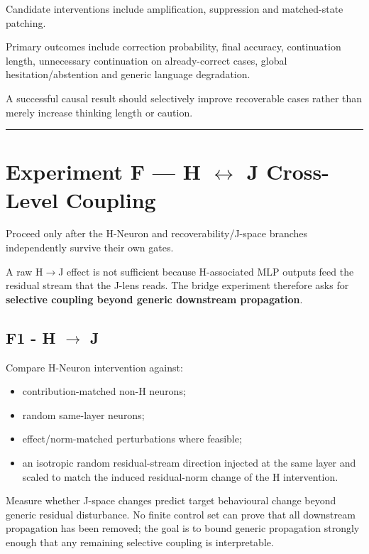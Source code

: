 Candidate interventions include amplification, suppression and matched-state patching.

Primary outcomes include correction probability, final accuracy, continuation length, unnecessary continuation on already-correct cases, global hesitation/abstention and generic language degradation.

A successful causal result should selectively improve recoverable cases rather than merely increase thinking length or caution.

\begin{center}\rule{0.5\linewidth}{0.5pt}\end{center}

\section{Experiment F --- H \texorpdfstring{$\leftrightarrow$}{<->} J Cross-Level Coupling}\label{experiment-f-h---j-cross-level-coupling}

Proceed only after the H-Neuron and recoverability/J-space branches independently survive their own gates.

A raw H\(\rightarrow\)J effect is not sufficient because H-associated MLP outputs feed the residual stream that the J-lens reads. The bridge experiment therefore asks for \textbf{selective coupling beyond generic downstream propagation}.

\subsection{F1 - H \texorpdfstring{$\rightarrow$}{->} J}\label{f1---h---j}

Compare H-Neuron intervention against:

\begin{itemize}
\tightlist
\item contribution-matched non-H neurons;
\item random same-layer neurons;
\item effect/norm-matched perturbations where feasible;
\item an isotropic random residual-stream direction injected at the same layer and scaled to match the induced residual-norm change of the H intervention.
\end{itemize}

Measure whether J-space changes predict target behavioural change beyond generic residual disturbance. No finite control set can prove that all downstream propagation has been removed; the goal is to bound generic propagation strongly enough that any remaining selective coupling is interpretable.

